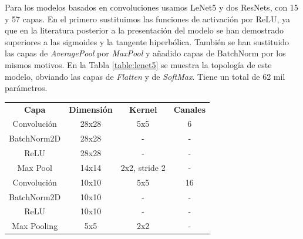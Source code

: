 Para los modelos basados en convoluciones usamos LeNet5 y dos ResNets, con 15 y 57 capas. En el primero sustituimos las funciones de activación por ReLU, ya que en la literatura posterior a la presentación del modelo se han demostrado superiores a las sigmoides y la tangente hiperbólica. También se han sustituido las capas de \textit{AveragePool} por \textit{MaxPool} y añadido capas de BatchNorm por los mismos motivos. En la Tabla \ref{table:lenet5} se muestra la topología de este modelo, obviando las capas de \textit{Flatten} y de \textit{SoftMax}. Tiene un total de 62 mil parámetros.



\begin{table}[]
\centering
\begin{tabular}{|c|c|c|c|}
\hline
\multirow{2}{*}{\textbf{Capa}} & \multirow{2}{*}{\textbf{Dimensión}} & \multirow{2}{*}{\textbf{Kernel}} & \multirow{2}{*}{\textbf{Canales}} \\
                               &                                     &                                  &                                   \\ \hline
Convolución                    & 28x28                               & 5x5                              & 6                                 \\ \hline
BatchNorm2D                    & 28x28                               & -                                & -                                 \\ \hline
ReLU                           & 28x28                               & -                                & -                                 \\ \hline
Max Pool                       & 14x14                               & 2x2, stride 2                    & -                                 \\ \hline
Convolución                    & 10x10                               & 5x5                              & 16                                \\ \hline
BatchNorm2D                    & 10x10                               & -                                & -                                 \\ \hline
ReLU                           & 10x10                               & -                                & -                                 \\ \hline
Max Pooling                    & 5x5                                 & 2x2                              & -                                 \\ \hline

\end{tabular}
\end{table}
